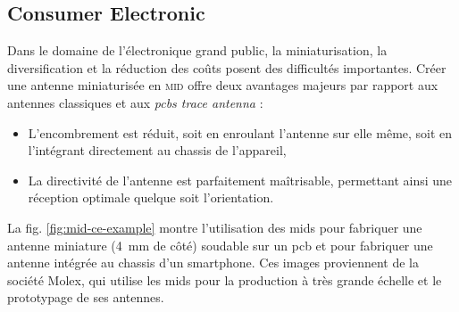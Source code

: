 \subsection{Consumer Electronic}
Dans le domaine de l'électronique grand public, la miniaturisation, la diversification et la réduction des coûts posent des difficultés importantes.
Créer une antenne miniaturisée en \textsc{mid} offre deux avantages majeurs par rapport aux antennes classiques et aux \textit{\glspl{pcb} trace antenna} :
\begin{itemize}
    \item L'encombrement est réduit, soit en enroulant l'antenne sur elle même, soit en l'intégrant directement au chassis de l'appareil,
    \item La directivité de l'antenne est parfaitement maîtrisable, permettant ainsi une réception optimale quelque soit l'orientation.
\end{itemize}
La fig. \ref{fig:mid-ce-example} montre l'utilisation des \glspl{mid} pour fabriquer une antenne miniature (\SI{4}{\milli\meter} de côté) soudable sur un \gls{pcb} et pour fabriquer une antenne intégrée au chassis d'un smartphone.
Ces images proviennent de la société Molex, qui utilise les \glspl{mid} pour la production à très grande échelle et le prototypage de ses antennes.

